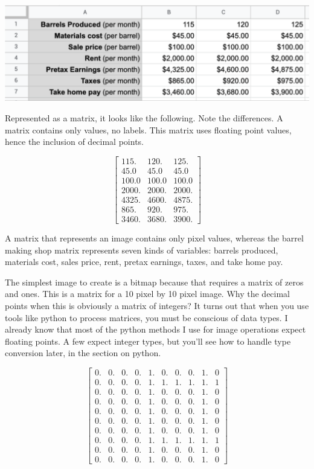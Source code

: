 \includegraphics[width=1.0\textwidth]{spreadsheet.png}

Represented as a matrix, it looks like the following. Note the differences. A matrix contains only values, no labels. This matrix uses floating point values, hence the inclusion of decimal points. 

$$\begin{bmatrix}
115. & 120. & 125.\\
45.0 & 45.0 & 45.0\\
100.0 & 100.0 & 100.0\\
2000. & 2000. & 2000.\\
4325. & 4600. & 4875.\\
865. & 920. & 975.\\
3460. & 3680. & 3900.
\end{bmatrix}$$
 
A matrix that represents an image contains only pixel values, whereas the barrel making shop matrix represents seven kinds of variables: barrels produced, materials cost, sales price, rent, pretax earnings, taxes, and take home pay. 

The simplest image to create is a bitmap because that requires a matrix of zeros and ones. This is a matrix for a 10 pixel by 10 pixel image. Why the decimal points when this is obviously a matrix of integers? It turns out that when you use tools like python to process matrices, you must be conscious of data types. I already know that most of the python methods I use for image operations expect floating points. A few expect integer types, but you'll see how to handle type conversion later, in the section on python. 

$$\begin{bmatrix}
0. & 0. & 0. & 0. & 1. & 0. & 0. & 0. & 1. & 0\\
0. & 0. & 0. & 0. & 1. & 1. & 1. & 1. & 1. & 1\\
0. & 0. & 0. & 0. & 1. & 0. & 0. & 0. & 1. & 0\\
0. & 0. & 0. & 0. & 1. & 0. & 0. & 0. & 1. & 0\\
0. & 0. & 0. & 0. & 1. & 0. & 0. & 0. & 1. & 0\\
0. & 0. & 0. & 0. & 1. & 0. & 0. & 0. & 1. & 0\\
0. & 0. & 0. & 0. & 1. & 0. & 0. & 0. & 1. & 0\\
0. & 0. & 0. & 0. & 1. & 1. & 1. & 1. & 1. & 1\\
0. & 0. & 0. & 0. & 1. & 0. & 0. & 0. & 1. & 0\\
0. & 0. & 0. & 0. & 1. & 0. & 0. & 0. & 1. & 0
\end{bmatrix}$$


